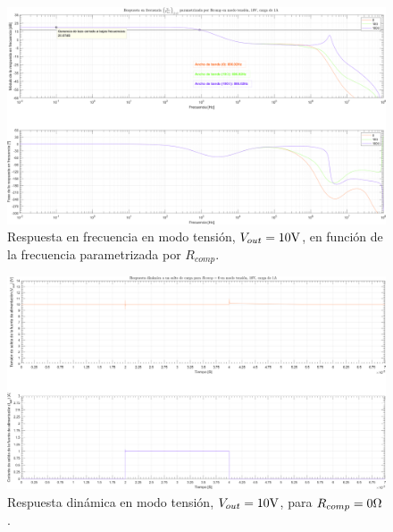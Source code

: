 \clearpage

\begin{figure}[H] %
\begin{center}
\includegraphics[width=1.1 \textwidth, angle=90]{./img/plots/rf/power_supply_RCOMP_RF_Modo1.png}
\caption{\label{fig:fig_power_supply_RCOMP_RF_Modo1}\footnotesize{Respuesta en frecuencia en modo tensión, $V_{out} = 10 \si[per-mode=symbol]{\volt}$, en función de la frecuencia parametrizada por $R_{comp}$.}}
\end{center}
\end{figure}

\clearpage

\begin{figure}[H] %
\begin{center}
\includegraphics[width=1.1 \textwidth, angle=90]{./img/plots/dynamic/power_supply_RCOMP_0_STEP_Modo1.png}
\caption{\label{fig:fig_power_supply_RCOMP_STEP_0_Modo1}\footnotesize{Respuesta dinámica en modo tensión, $V_{out} = 10 \si[per-mode=symbol]{\volt}$, para $R_{comp} = 0 \si[per-mode=symbol]{\ohm} $.}}
\end{center}
\end{figure}

